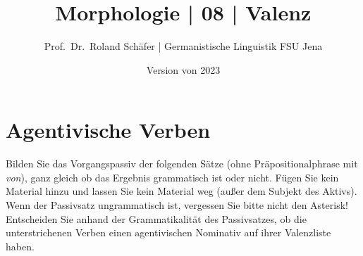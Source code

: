 \documentclass[12pt,a4paper,twoside]{article}
\author{Prof.\ Dr.\ Roland Schäfer | Germanistische Linguistik FSU Jena}
\title{Morphologie | 08 | Valenz}
\date{Version von 2023}
\newcommand{\Zeile}{\vspace{\baselineskip}}
\begin{document}
\maketitle

\Zeile

\section{Agentivische Verben}

Bilden Sie das Vorgangspassiv der folgenden Sätze (ohne Präpositionalphrase mit \textit{von}), ganz gleich ob das Ergebnis grammatisch ist oder nicht.
Fügen Sie kein Material hinzu und lassen Sie kein Material weg (außer dem Subjekt des Aktivs).
Wenn der Passivsatz ungrammatisch ist, vergessen Sie bitte nicht den Asterisk!
Entscheiden Sie anhand der Grammatikalität des Passivsatzes, ob die unterstrichenen Verben einen agentivischen Nominativ auf ihrer Valenzliste haben.

\Zeile
\end{document}

